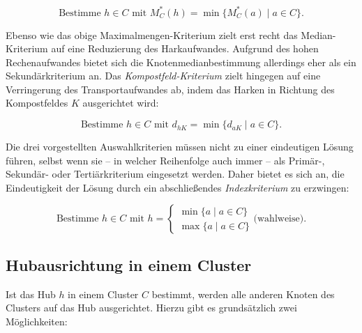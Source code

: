 \documentclass[fontsize=12pt,doubleside,openany,listof=totoc,listof=flat,listof=nochaptergap,numbers=noenddot]{scrbook}
\theoremstyle{style}
\begin{document}
\begin{equation}
\text{Bestimme } h \in C \text{ mit } M^*_C(h) = \min\{M^*_C(a) \mid a \in C\}.
\label{Mediankriterium}
\end{equation}

\noindent Ebenso wie das obige Maximalmengen-Kriterium zielt erst recht das Median-Kriterium auf eine Reduzierung des Harkaufwandes. Aufgrund des hohen Rechenaufwandes bietet sich die Knotenmedianbestimmung allerdings eher als ein Sekundärkriterium an. Das \textit{Kompostfeld-Kriterium} zielt hingegen auf eine Verringerung des Transportaufwandes ab, indem das Harken in Richtung des Kompostfeldes $K$ ausgerichtet wird:

\begin{equation}
\text{Bestimme } h \in C \text{ mit } d_{hK} = \min\{d_{aK} \mid a \in C\}.
\label{Kompostfeldkriterium}
\end{equation}

\noindent Die drei vorgestellten Auswahlkriterien müssen nicht zu einer eindeutigen Lösung führen, selbst wenn sie -- in welcher Reihenfolge auch immer -- als Primär-, Sekundär- oder Tertiärkriterium eingesetzt werden. Daher bietet es sich an, die Eindeutigkeit der Lösung durch ein abschließendes \textit{Indexkriterium} zu erzwingen:

\begin{equation}
\text{Bestimme } h \in C \text{ mit } h = 
\begin{cases} 
\min\{a \mid a \in C\} \\
\max\{a \mid a \in C\} 
\end{cases} \text{(wahlweise)}.
\label{Indexkriterium} 
\end{equation}

\subsection{Hubausrichtung in einem Cluster}
\label{section_Hubausrichtung}

Ist das Hub $h$ in einem Cluster $C$ bestimmt, werden alle anderen Knoten des Clusters auf das Hub ausgerichtet. Hierzu gibt es grundsätzlich zwei Möglichkeiten:\\ 
\end{document}
